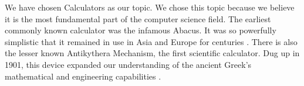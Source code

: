 \documentclass[../computer-history.tex]{subfiles}
\begin{document}
We have chosen Calculators as our topic. We chose this topic because we believe it is the most fundamental part of the computer science field. The earliest commonly known calculator was the infamous Abacus. It was so powerfully simplistic that it remained in use in Asia and Europe for centuries \cite{CHM}. There is also the lesser known Antikythera Mechanism, the first scientific calculator. Dug up in 1901, this device expanded our understanding of the ancient Greek's mathematical and engineering capabilities \cite{CHM}.

\biblio
\end{document}
